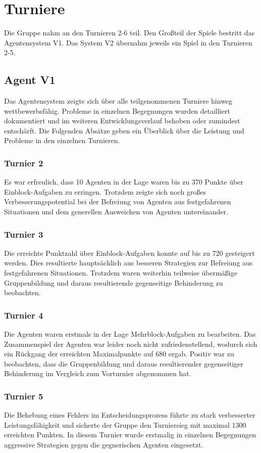 \documentclass[runningheads]{llncs}
\begin{document}
\section{Turniere}\label{Turniere}
Die Gruppe nahm an den Turnieren 2-6 teil. Den Großteil der Spiele bestritt das Agentensystem V1. Das System V2 übernahm jeweils ein Spiel in den Turnieren 2-5. 

\subsection{Agent V1}
Das Agentensystem zeigte sich über alle teilgenommenen Turniere hinweg wettbewerbsfähig. Probleme in einzelnen Begegnungen wurden detailliert dokumentiert und im weiteren Entwicklungsverlauf behoben oder zumindest entschärft. Die Folgenden Absätze geben ein Überblick über die Leistung und Probleme in den einzelnen Turnieren.

\subsubsection{Turnier 2}
Es war erfreulich, dass 10 Agenten in der Lage waren bis zu 370 Punkte über Einblock-Aufgaben zu erringen. Trotzdem zeigte sich noch großes Verbesserungspotential bei der Befreiung von Agenten aus festgefahrenen Situationen und dem generellen Ausweichen von Agenten untereinander.

\subsubsection{Turnier 3}
Die erreichte Punktzahl über Einblock-Aufgaben konnte auf bis zu 720 gesteigert werden. Dies resultierte hauptsächlich aus besseren Strategien zur Befreiung aus festgefahrenen Situationen. Trotzdem waren weiterhin teilweise übermäßige Gruppenbildung und daraus resultierende gegenseitige Behinderung zu beobachten.

\subsubsection{Turnier 4}
Die Agenten waren erstmals in der Lage Mehrblock-Aufgaben zu bearbeiten. Das Zusammenspiel der Agenten war leider noch nicht zufriedenstellend, wodurch sich ein Rückgang der erreichten Maximalpunkte auf 680 ergab. Positiv war zu beobachten, dass die Gruppenbildung und daraus resultierender gegenseitiger Behinderung im Vergleich zum Vorturnier abgenommen hat.

\subsubsection{Turnier 5}
 Die Behebung eines Fehlers im Entscheidungsprozess führte zu stark verbesserter Leistungsfähigkeit und sicherte der Gruppe den Turniersieg mit maximal 1300 erreichten Punkten. In diesem Turnier wurde erstmalig in einzelnen Begegnungen aggressive Strategien gegen die gegnerischen Agenten eingesetzt.
\end{document}
